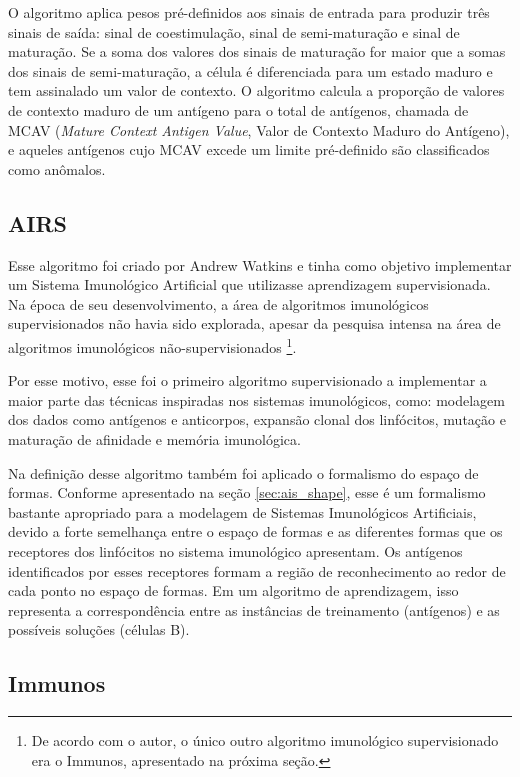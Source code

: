 O algoritmo aplica pesos pré-definidos aos sinais de entrada para produzir três sinais de saída: sinal de coestimulação, sinal de semi-maturação e sinal de maturação. Se a soma dos valores dos sinais de maturação for maior que a somas dos sinais de semi-maturação, a célula é diferenciada para um estado maduro e tem assinalado um valor de contexto. O algoritmo calcula a proporção de valores de contexto maduro de um antígeno para o total de antígenos, chamada de MCAV (\emph{Mature Context Antigen Value}, Valor de Contexto Maduro do Antígeno), e aqueles antígenos cujo MCAV excede um limite pré-definido são classificados como anômalos.

\subsection{AIRS}
\label{sec:prop_airs}

Esse algoritmo foi criado por Andrew Watkins \cite{Andrew2003} e tinha como objetivo implementar um Sistema Imunológico Artificial que utilizasse aprendizagem supervisionada. Na época de seu desenvolvimento, a área de algoritmos imunológicos supervisionados não havia sido explorada, apesar da pesquisa intensa na área de algoritmos imunológicos não-supervisionados \footnote{De acordo com o autor, o único outro algoritmo imunológico supervisionado era o Immunos, apresentado na próxima seção.}.

Por esse motivo, esse foi o primeiro algoritmo supervisionado a implementar a maior parte das técnicas inspiradas nos sistemas imunológicos, como: modelagem dos dados como antígenos e anticorpos, expansão clonal dos linfócitos, mutação e maturação de afinidade e memória imunológica.

Na definição desse algoritmo também foi aplicado o formalismo do espaço de formas. Conforme apresentado na seção \ref{sec:ais_shape}, esse é um formalismo bastante apropriado para a modelagem de Sistemas Imunológicos Artificiais, devido a forte semelhança entre o espaço de formas e as diferentes formas que os receptores dos linfócitos no sistema imunológico apresentam. Os antígenos identificados por esses receptores formam a região de reconhecimento ao redor de cada ponto no espaço de formas. Em um algoritmo de aprendizagem, isso representa a correspondência entre as instâncias de treinamento (antígenos) e as possíveis soluções (células B).

\subsection{Immunos}
\label{sec:prop_immunos}

